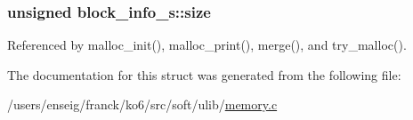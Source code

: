 \hypertarget{structblock__info__s_ac5d895bc19d09c9bb8dc9dafea66e159}{
\subsubsection[{size}]{\setlength{\rightskip}{0pt plus 5cm}unsigned block\-\_\-info\-\_\-s\-::size}}\label{structblock__info__s_ac5d895bc19d09c9bb8dc9dafea66e159}


Referenced by malloc\-\_\-init(), malloc\-\_\-print(), merge(), and try\-\_\-malloc().



The documentation for this struct was generated from the following file\-:\begin{DoxyCompactItemize}
\item 
/users/enseig/franck/ko6/src/soft/ulib/\hyperlink{memory_8c}{memory.\-c}\end{DoxyCompactItemize}
